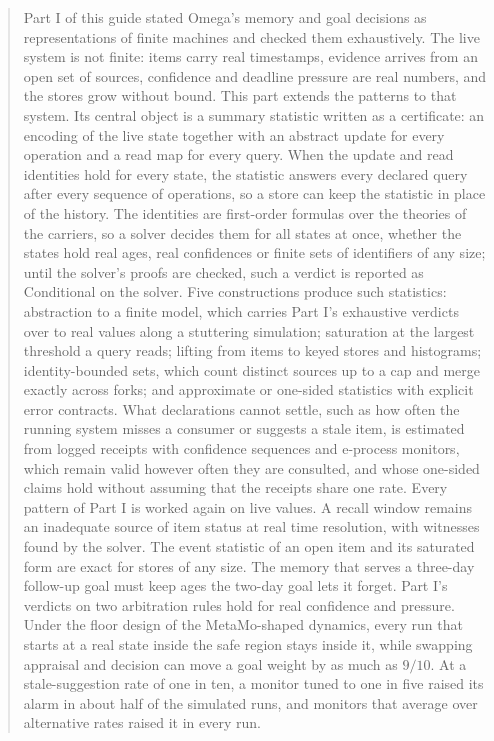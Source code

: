 \documentclass[11pt]{article}
\theoremstyle{definition}
\theoremstyle{plain}
\begin{document}
\begin{abstract}
\noindent
Part I of this guide stated Omega's memory and goal decisions as representations of finite
machines and checked them exhaustively. The live system is not finite: items carry real
timestamps, evidence arrives from an open set of sources, confidence and deadline pressure are
real numbers, and the stores grow without bound. This part extends the patterns to that system.
Its central object is a summary statistic written as a certificate: an encoding of the live state
together with an abstract update for every operation and a read map for every query. When the
update and read identities hold for every state, the statistic answers every declared query after
every sequence of operations, so a store can keep the statistic in place of the history. The
identities are first-order formulas over the theories of the carriers, so a solver decides them
for all states at once, whether the states hold real ages, real confidences or finite sets of
identifiers of any size; until the solver's proofs are checked, such a verdict is reported as
Conditional on the solver. Five constructions produce such statistics: abstraction to a finite model,
which carries Part I's exhaustive verdicts over to real values along a stuttering simulation;
saturation at the largest threshold a query reads; lifting from items to keyed stores and
histograms; identity-bounded sets, which count distinct sources up to a cap and merge exactly
across forks; and approximate or one-sided statistics with explicit error contracts. What
declarations cannot settle, such as how often the running system misses a consumer or suggests a
stale item, is estimated from logged receipts with confidence sequences and e-process monitors,
which remain valid however often they are consulted, and whose one-sided claims hold without
assuming that the receipts share one rate. Every pattern of Part I is worked again on
live values. A recall window remains an inadequate source of item status at real time resolution,
with witnesses found by the solver. The event statistic of an open item and its saturated form are
exact for stores of any size. The memory that serves a three-day follow-up goal must keep ages the
two-day goal lets it forget. Part I's verdicts on two arbitration rules hold for real confidence and
pressure. Under the floor design of the MetaMo-shaped dynamics, every run that starts at a real
state inside the safe region stays inside it, while swapping appraisal and decision can move a goal
weight by as much as $9/10$. At a stale-suggestion rate of one in ten, a monitor tuned to one in
five raised its alarm in about half of the simulated runs, and monitors that average over
alternative rates raised it in every run.
\end{abstract}
\end{document}
